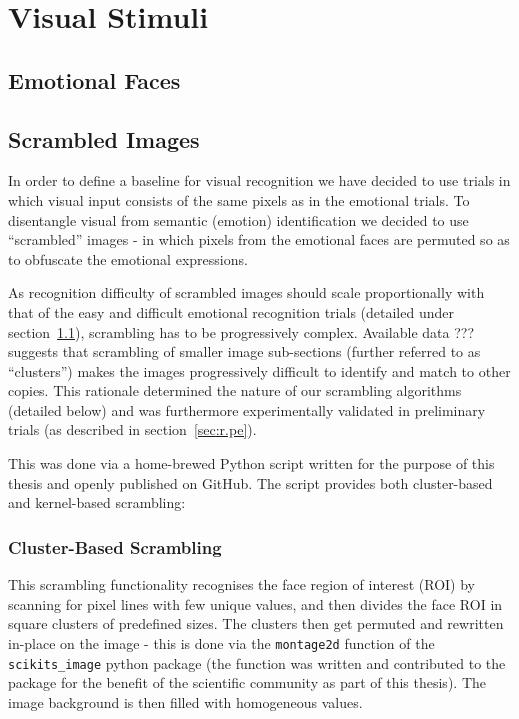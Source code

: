     \section{Visual Stimuli}
	\subsection{Emotional Faces}\label{sec:m.vs.ef}
	\subsection{Scrambled Images}\label{sec:m.vs.si}
	In order to define a baseline for visual recognition we have decided to use trials in which visual input consists of the same pixels as in the emotional trials. 
	To disentangle visual from semantic (emotion) identification we decided to use “scrambled” images - in which pixels from the emotional faces are permuted so as to obfuscate the emotional expressions.
	
	As recognition difficulty of scrambled images should scale proportionally with that of the easy and difficult emotional recognition trials (detailed under section~\ref{sec:m.vs.ef}), scrambling has to be progressively complex.
	Available data ??? suggests that scrambling of smaller image sub-sections (further referred to as “clusters”) makes the images progressively difficult to identify and match to other copies.
	This rationale determined the nature of our scrambling algorithms (detailed below) and was furthermore experimentally validated in preliminary trials (as described in section~\ref{sec:r.pe}).
	
	This was done via a home-brewed Python script written for the purpose of this thesis and openly published on GitHub.
	The script provides both cluster-based and kernel-based scrambling:
	    \subsubsection{Cluster-Based Scrambling}
	    This scrambling functionality recognises the face region of interest (ROI) by scanning for pixel lines with few unique values, and then divides the face ROI in square clusters of predefined sizes.
	    The clusters then get permuted and rewritten in-place on the image - this is done via the \colorbox{vlg}{\texttt{montage2d}} function of the \colorbox{vlg}{\texttt{scikits\_image}} python package 
	    (the function was written and contributed to the package for the benefit of the scientific community as part of this thesis).
	    The image background is then filled with homogeneous values.
